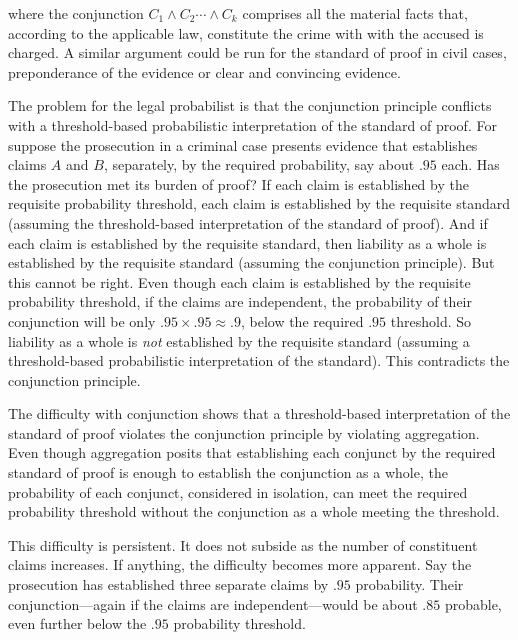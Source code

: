 \documentclass[
  10pt,
  dvipsnames,enabledeprecatedfontcommands]{scrartcl}
\newcommand{\et}{\wedge}
\begin{document}
\noindent where the conjunction \(C_1 \et C_2 \cdots \et C_k\) comprises
all the material facts that, according to the applicable law, constitute
the crime with with the accused is charged. A similar argument could be
run for the standard of proof in civil cases, preponderance of the
evidence or clear and convincing evidence.

The problem for the legal probabilist is that the conjunction principle
conflicts with a threshold-based probabilistic interpretation of the
standard of proof. For suppose the prosecution in a criminal case
presents evidence that establishes claims \(A\) and \(B\), separately,
by the required probability, say about \(.95\) each. Has the prosecution
met its burden of proof? If each claim is established by the requisite
probability threshold, each claim is established by the requisite
standard (assuming the threshold-based interpretation of the standard of
proof). And if each claim is established by the requisite standard, then
liability as a whole is established by the requisite standard (assuming
the conjunction principle). But this cannot be right. Even though each
claim is established by the requisite probability threshold, if the
claims are independent, the probability of their conjunction will be
only \(.95\times .95 \approx .9\), below the required \(.95\) threshold.
So liability as a whole is \textit{not} established by the requisite
standard (assuming a threshold-based probabilistic interpretation of the
standard). This contradicts the conjunction principle.

The difficulty with conjunction shows that a threshold-based
interpretation of the standard of proof violates the conjunction
principle by violating aggregation. Even though aggregation posits that
establishing each conjunct by the required standard of proof is enough
to establish the conjunction as a whole, the probability of each
conjunct, considered in isolation, can meet the required probability
threshold without the conjunction as a whole meeting the threshold.

This difficulty is persistent. It does not subside as the number of
constituent claims increases. If anything, the difficulty becomes more
apparent. Say the prosecution has established three separate claims by
\(.95\) probability. Their conjunction---again if the claims are
independent---would be about \(.85\) probable, even further below the
\(.95\) probability threshold.
\end{document}
